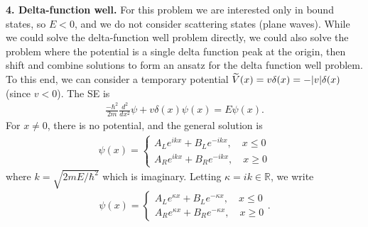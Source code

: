\documentclass{article}
\theoremstyle{definition}
\newcommand{\f}[2]{\frac{#1}{#2}}
\begin{document}
\noindent \textbf{4. Delta-function well.} For this problem we are interested only in bound states, so $E<0$, and we do not consider scattering states (plane waves).  While we could solve the delta-function well problem directly, we could also solve the problem where the potential is a single delta function peak at the origin,  then shift and combine solutions to form an ansatz for the delta function well problem. To this end, we can consider a temporary potential $\widetilde{V}(x) = v\delta(x) = -\abs{v} \delta(x)$ (since $v<0$). The SE is 
\begin{align*}
\f{-\hbar^2}{2m}\f{d^2}{dx^2}\psi + v\delta(x)\psi(x) = E\psi(x).
\end{align*}
For $x\neq 0$, there is no potential, and the general solution is 
\begin{align*}
\psi(x) = 
\begin{cases}
A_L e^{i kx } + B_L e^{-ikx}, \quad x \leq 0 \\
A_R e^{i kx } + B_R e^{-ikx}, \quad x \geq 0
\end{cases}
\end{align*}
where $k = \sqrt{2mE / \hbar^2}$ which is imaginary. Letting $\kappa = ik \in \mathbb{R}$, we write
\begin{align*}
\psi(x) = 
\begin{cases}
A_L e^{\kappa x } + B_L e^{-\kappa x}, \quad x \leq  0 \\
A_R e^{\kappa x } + B_R e^{-\kappa x}, \quad x \geq  0
\end{cases}.
\end{align*}
\end{document}
